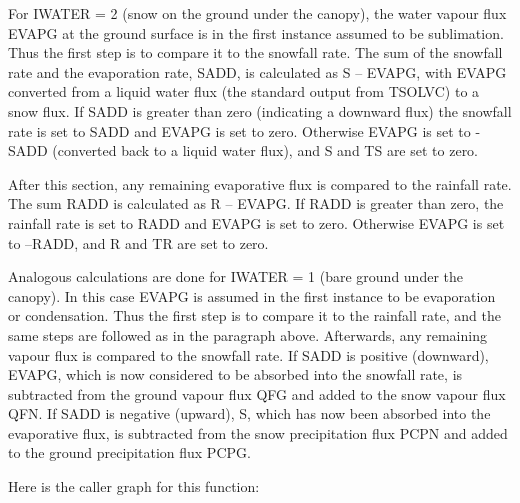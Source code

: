 For I\+W\+A\+T\+E\+R = 2 (snow on the ground under the canopy), the water vapour flux E\+V\+A\+P\+G at the ground surface is in the first instance assumed to be sublimation. Thus the first step is to compare it to the snowfall rate. The sum of the snowfall rate and the evaporation rate, S\+A\+D\+D, is calculated as S – E\+V\+A\+P\+G, with E\+V\+A\+P\+G converted from a liquid water flux (the standard output from T\+S\+O\+L\+V\+C) to a snow flux. If S\+A\+D\+D is greater than zero (indicating a downward flux) the snowfall rate is set to S\+A\+D\+D and E\+V\+A\+P\+G is set to zero. Otherwise E\+V\+A\+P\+G is set to -\/\+S\+A\+D\+D (converted back to a liquid water flux), and S and T\+S are set to zero.

After this section, any remaining evaporative flux is compared to the rainfall rate. The sum R\+A\+D\+D is calculated as R – E\+V\+A\+P\+G. If R\+A\+D\+D is greater than zero, the rainfall rate is set to R\+A\+D\+D and E\+V\+A\+P\+G is set to zero. Otherwise E\+V\+A\+P\+G is set to –\+R\+A\+D\+D, and R and T\+R are set to zero.

Analogous calculations are done for I\+W\+A\+T\+E\+R = 1 (bare ground under the canopy). In this case E\+V\+A\+P\+G is assumed in the first instance to be evaporation or condensation. Thus the first step is to compare it to the rainfall rate, and the same steps are followed as in the paragraph above. Afterwards, any remaining vapour flux is compared to the snowfall rate. If S\+A\+D\+D is positive (downward), E\+V\+A\+P\+G, which is now considered to be absorbed into the snowfall rate, is subtracted from the ground vapour flux Q\+F\+G and added to the snow vapour flux Q\+F\+N. If S\+A\+D\+D is negative (upward), S, which has now been absorbed into the evaporative flux, is subtracted from the snow precipitation flux P\+C\+P\+N and added to the ground precipitation flux P\+C\+P\+G.

Here is the caller graph for this function\+:


